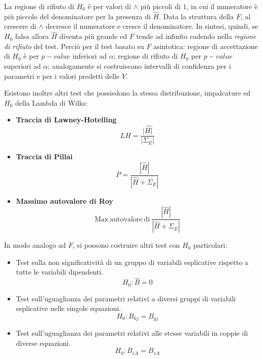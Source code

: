 \documentclass[a4page, 11pt]{article} %
\begin{document}
La regione di rifiuto di $H_0$ è per valori di $\wedge$ più piccoli di $1$, in cui il numeratore è più piccolo del denominatore per la presenza di $\hat{H}$.
Data la struttura della $F$, al crescere di $\wedge$ decresce il numeratore e cresce il denominatore. In sintesi, quindi, se $H_0$ falsa allora $\hat{H}$ diventa più grande ed $F$ tende ad infinito cadendo nella \textit{regione di rifiuto} del test.
\newline
\newline
Perciò per il test basato su $F$ asintotica:
regione di accettazione di $H_0$ è per $p-value$ inferiori ad $\alpha$;
regione di rifiuto di $H_0$ per $p-value$ superiori ad $\alpha$;
analogamente si costruiscono intervalli di confidenza per i parametri e per i valori predetti delle $Y$.

Esistono inoltre altri test che possiedono la stessa distribuzione, impalcature ed $H_0$ della Lambda di Wilks:
\begin{itemize}[noitemsep]
\item \textbf{Traccia di Lawney-Hotelling}
\begin{equation*}
LH = \frac{|\hat{H|}}{|\Sigma_E|}
\end{equation*}
\item \textbf{Traccia di Pillai}
\begin{equation*}
P = \frac{|\hat{H}|}{|\hat{H}+\Sigma_E|}
\end{equation*}
\item \textbf{Massimo autovalore di Roy}
\begin{equation*}
\mathrm{Max \ autovalore\  di \ } \frac{|\hat{H}|}{|\hat{H}+\Sigma_E|}
\end{equation*}
\end{itemize}
In modo analogo ad $F$, si possono costruire altri test con $H_0$ particolari:
\begin{itemize}[noitemsep]
\item Test sulla non significatività di un gruppo di variabili esplicative rispetto a tutte le variabili dipendenti.
\begin{equation*}
H_0 : \hat{B} = 0
\end{equation*}
\item Test sull’uguaglianza dei parametri relativi a diversi gruppi di variabili esplicative nelle singole equazioni.
\begin{equation*}
H_0 : B_{kj} = B_{gj} 
\end{equation*}
\item Test sull'uguaglianza dei parametri relativi alle stesse variabili in coppie di diverse equazioni.
\begin{equation*}
H_0 : B_{cA} = B_{vA}
\end{equation*}
\end{itemize}
\end{document}
